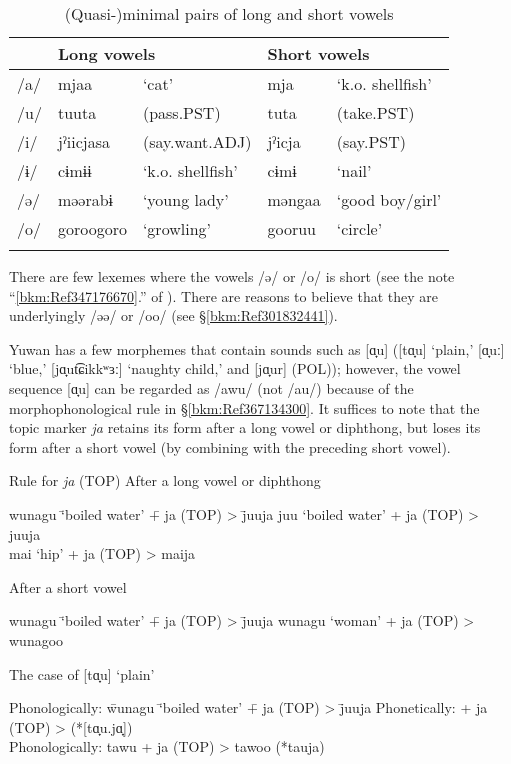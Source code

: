 \begin{table}
\caption{(Quasi-)minimal pairs of long and short vowels}
\begin{tabular}{ *{5}{l} } 
\lsptoprule
 & \multicolumn{2}{l}{Long vowels} & \multicolumn{2}{l}{Short vowels}\\\midrule
{/a/} & {mjaa} & {‘cat’} & {mja} & {‘k.o. shellfish’}\\
{/u/} & {tuuta} & {(pass.PST)} & {tuta} & {(take.PST)}\\
{/i/} & {jˀiicjasa} & {(say.want.ADJ)} & {jˀicja} & {(say.PST)}\\
{/ɨ/} & {cɨmɨɨ} & {‘k.o. shellfish’} & cɨmɨ & {‘nail’}\\
{/ə/} & {məərabɨ} & {‘young lady’} & {məngaa} & {‘good boy/girl’}\\
{/o/} & {goroogoro} & {‘growling’} & {gooruu} & {‘circle’}\\
\lspbottomrule
\end{tabular}
\end{table}

There are few lexemes where the vowels /ə/ or /o/ is short (see the note “\ref{bkm:Ref347176670}.” of ). There are reasons to believe that they are underlyingly /əə/ or /oo/ (see §\ref{bkm:Ref301832441}).

Yuwan has a few morphemes that contain sounds such as [ɑ̟u] ([tɑ̟u] ‘plain,’ [ɑ̟uː] ‘blue,’ [jɑ̟ut͡ɕikkʷɜː] ‘naughty child,’ and [jɑ̟ur] (POL)); however, the vowel sequence [ɑ̟u] can be regarded as /awu/ (not /au/) because of the morphophonological rule in §\ref{bkm:Ref367134300}. It suffices to note that the topic marker \textit{ja} retains its form after a long vowel or diphthong, but loses its form after a short vowel (by combining with the preceding short vowel).

\ea Rule for \textit{ja} (TOP)
\ea After a long vowel or diphthong\\
\begin{tabbing}
    wunagu  \= ‘boiled water’ \=  +   ja   (TOP)   > \=  juuja\kill
    juu  \> ‘boiled water’ \>  +   ja   (TOP)   > \>  juuja\\
    mai  \> ‘hip’          \>  +   ja   (TOP)   > \>  maija
\end{tabbing}
\ex After a short vowel\\
\begin{tabbing}
    wunagu  \= ‘boiled water’ \=  +   ja   (TOP)   > \=  juuja\kill
    wunagu \>  ‘woman’  \> +  ja (TOP)  >  \> wunagoo
\end{tabbing}
\z
\ex The case of [tɑ̟u] ‘plain’\\
\begin{tabbing}
    Phonologically: \= wunagu  \= ‘boiled water’ \=  +   ja   (TOP)   > \=  juuja\kill
    Phonetically:  \> [tɑ̟u] \>  +   ja (TOP)   >  \> [tɑ̟.ʷo̞ː]   (*[tɑ̟u.jɑ̟])\\
    Phonologically: \>   tawu \>  +   ja (TOP)   >  \> tawoo   (*tauja)
\end{tabbing}
\z

